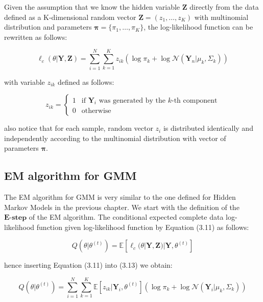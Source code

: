 Given the assumption that we know the hidden variable $\textbf{Z}$ directly from the data defined as a K-dimensional random vector $\textbf{Z}=(z_1,\ldots,z_K)$ 
with multinomial distribution and parameters $\boldsymbol{\pi} = \{\pi_1,\ldots,\pi_K\}$, the log-likelihood function can be rewritten as follows:

\begin{equation}
    \ell_c(\theta|\textbf{Y},\textbf{Z}) = \sum_{i=1}^{N} \sum_{k=1}^{K} z_{ik} \left(\log \pi_k + \log \mathcal{N}(\textbf{Y}_n|\mu_k,\Sigma_k)\right)
\end{equation}

with variable $z_{ik}$ defined as follows:

\begin{equation}
    z_{ik} = \begin{cases}
        1 & \text{if } \textbf{Y}_i \text{ was generated by the } k\text{-th component} \\
        0 & \text{otherwise}
    \end{cases}
\end{equation}

also notice that for each sample, random vector $z_{i}$ is distributed identically and independently according to the multinomial distribution with vector of parameters $\boldsymbol{\pi}$.

\subsection{EM algorithm for GMM}

The EM algorithm for GMM is very similar to the one defined for Hidden Markov Models in the previous chapter. 
We start with the definition of the $\textbf{E-step}$ of the EM algorithm. The conditional expected complete 
data log-likelihood function given log-likelihood function by Equation (3.11) as follows:

\begin{equation}
    Q(\theta|\theta^{(t)}) = \mathbb{E}[\ell_c(\theta|\textbf{Y},\textbf{Z})|\textbf{Y},\theta^{(t)}]
\end{equation}

hence inserting Equation (3.11) into (3.13) we obtain:

\begin{equation}
    Q(\theta|\theta^{(t)}) = \sum_{i=1}^{N} \sum_{k=1}^{K} \mathbb{E}[z_{ik}|\textbf{Y}_i,\theta^{(t)}] \left(\log \pi_k + \log \mathcal{N}(\textbf{Y}_i|\mu_k,\Sigma_k)\right)
\end{equation}

